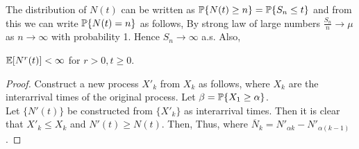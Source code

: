 \documentclass[all-lectures.tex]{subfiles}
\begin{document}
The distribution of $N(t)$ can be written as $\P\{N(t) \ge n\} = \P\{S_n \le t\}$ and from this we can write $\P\{N(t)=n\}$ as follows,
By strong law of large numbers $\frac{S_n}{n} \to \mu$ as $n \to \infty$ with probability 1. Hence $S_n \rightarrow \infty$ a.s.
Also, 
\begin{prop}
$\E[N^r(t)] < \infty$ for $r > 0, t \ge 0$.
\end{prop}
\begin{proof}
Construct a new process $X'_k$ from $X_k$ as follows,
where $X_k$ are the interarrival times of the original process. Let $\beta = \P\{X_1\geq \alpha\}$.\\
\indent Let $\{N'(t)\}$ be constructed from $\{X'_k\}$ as interarrival times. Then it is clear that $X'_k \le X_k$ and $N'(t) \ge N(t)$.
Then, 
Thus,
where $\overline{N}_{k} = N'_{\alpha k}-N'_{\alpha(k-1)}$. 
\end{proof}
\end{document}
